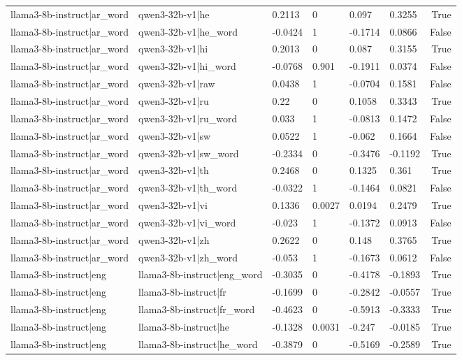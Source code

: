 \begin{table}
\begin{tabular}{llllllr}
llama3-8b-instruct|ar_word & qwen3-32b-v1|he & 0.2113 & 0 & 0.097 & 0.3255 & True \\
llama3-8b-instruct|ar_word & qwen3-32b-v1|he_word & -0.0424 & 1 & -0.1714 & 0.0866 & False \\
llama3-8b-instruct|ar_word & qwen3-32b-v1|hi & 0.2013 & 0 & 0.087 & 0.3155 & True \\
llama3-8b-instruct|ar_word & qwen3-32b-v1|hi_word & -0.0768 & 0.901 & -0.1911 & 0.0374 & False \\
llama3-8b-instruct|ar_word & qwen3-32b-v1|raw & 0.0438 & 1 & -0.0704 & 0.1581 & False \\
llama3-8b-instruct|ar_word & qwen3-32b-v1|ru & 0.22 & 0 & 0.1058 & 0.3343 & True \\
llama3-8b-instruct|ar_word & qwen3-32b-v1|ru_word & 0.033 & 1 & -0.0813 & 0.1472 & False \\
llama3-8b-instruct|ar_word & qwen3-32b-v1|sw & 0.0522 & 1 & -0.062 & 0.1664 & False \\
llama3-8b-instruct|ar_word & qwen3-32b-v1|sw_word & -0.2334 & 0 & -0.3476 & -0.1192 & True \\
llama3-8b-instruct|ar_word & qwen3-32b-v1|th & 0.2468 & 0 & 0.1325 & 0.361 & True \\
llama3-8b-instruct|ar_word & qwen3-32b-v1|th_word & -0.0322 & 1 & -0.1464 & 0.0821 & False \\
llama3-8b-instruct|ar_word & qwen3-32b-v1|vi & 0.1336 & 0.0027 & 0.0194 & 0.2479 & True \\
llama3-8b-instruct|ar_word & qwen3-32b-v1|vi_word & -0.023 & 1 & -0.1372 & 0.0913 & False \\
llama3-8b-instruct|ar_word & qwen3-32b-v1|zh & 0.2622 & 0 & 0.148 & 0.3765 & True \\
llama3-8b-instruct|ar_word & qwen3-32b-v1|zh_word & -0.053 & 1 & -0.1673 & 0.0612 & False \\
llama3-8b-instruct|eng & llama3-8b-instruct|eng_word & -0.3035 & 0 & -0.4178 & -0.1893 & True \\
llama3-8b-instruct|eng & llama3-8b-instruct|fr & -0.1699 & 0 & -0.2842 & -0.0557 & True \\
llama3-8b-instruct|eng & llama3-8b-instruct|fr_word & -0.4623 & 0 & -0.5913 & -0.3333 & True \\
llama3-8b-instruct|eng & llama3-8b-instruct|he & -0.1328 & 0.0031 & -0.247 & -0.0185 & True \\
llama3-8b-instruct|eng & llama3-8b-instruct|he_word & -0.3879 & 0 & -0.5169 & -0.2589 & True \\

\end{tabular}
\end{table}
